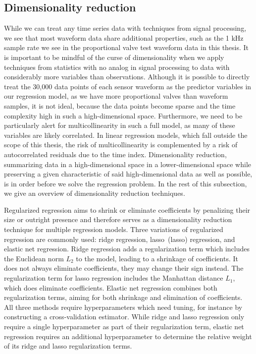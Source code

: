 \subsection{Dimensionality reduction}

While we can treat any time series data with techniques from signal processing, we see that most waveform data share additional properties, such as the 1 kHz sample rate we see in the proportional valve test waveform data in this thesis.
It is important to be mindful of the curse of dimensionality \citep{hastie2009elements} when we apply techniques from statistics with no analog in signal processing to data with considerably more variables than observations.
Although it is possible to directly treat the 30,000 data points of each sensor waveform as the predictor variables in our regression model, as we have more proportional valves than waveform samples, it is not ideal, because the data points become sparse and the time complexity high in such a high-dimensional space.
Furthermore, we need to be particularly alert for multicollinearity in such a full model, as many of these variables are likely correlated.
In linear regression models, which fall outside the scope of this thesis, the risk of multicollinearity is complemented by a risk of autocorrelated residuals due to the time index.
Dimensionality reduction, summarizing data in a high-dimensional space in a lower-dimensional space while preserving a given characteristic of said high-dimensional data as well as possible, is in order before we solve the regression problem.
In the rest of this subsection, we give an overview of dimensionality reduction techniques.

Regularized regression aims to shrink or eliminate coefficients by penalizing their size or outright presence and therefore serves as a dimensionality reduction technique for multiple regression models.
Three variations of regularized regression are commonly used: ridge regression, \acrlong{lasso}~(\acrshort{lasso}) regression, and elastic net regression.
Ridge regression adds a regularization term which includes the Euclidean norm $L_{2}$ to the model, leading to a shrinkage of coefficients.
It does not always eliminate coefficients, they may change their sign instead.
The regularization term for \acrlong{lasso} regression includes the Manhattan distance $L_{1}$, which does eliminate coefficients.
Elastic net regression combines both regularization terms, aiming for both shrinkage and elimination of coefficients.
All three methods require hyperparameters which need tuning, for instance by constructing a cross-validation estimator.
While ridge and \acrlong{lasso} regression only require a single hyperparameter as part of their regularization term, elastic net regression requires an additional hyperparameter to determine the relative weight of its ridge and \acrshort{lasso} regularization terms.

